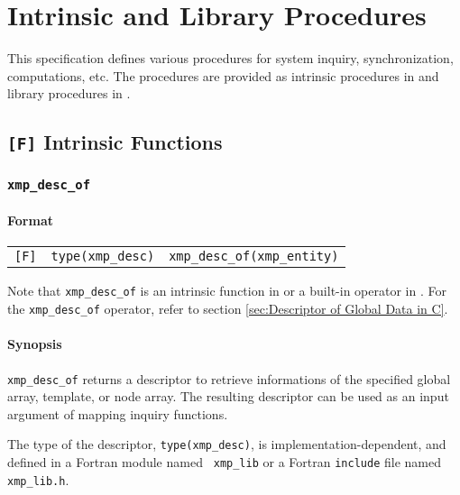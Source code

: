 \chapter{Intrinsic and Library Procedures}
\label{chap:Intrinsic and library procedures}

This specification defines various procedures for system inquiry,
synchronization, computations, etc. The procedures are provided as
intrinsic procedures in {\XMPF} and library procedures in {\XMPC}.

\section{{\tt [F]} Intrinsic Functions}

\subsection{{\tt xmp\_desc\_of}}
\label{subsec: xmp_desc_of}

\subsubsection*{Format}

\begin{tabular}{lll}

\verb![F]!&  {\tt type(xmp\_desc)}& {\tt xmp\_desc\_of(xmp\_entity)}\\

\end{tabular}

\vspace{0.3cm}

Note that {\tt xmp\_desc\_of} is an intrinsic function in {\XMPF} or
a built-in operator in {\XMPC}. For the {\tt xmp\_desc\_of} operator,
refer to section \ref{sec:Descriptor of Global Data in C}.

\subsubsection*{Synopsis}

{\tt xmp\_desc\_of} returns a descriptor to retrieve informations of the
specified global array, template, or node array. The resulting
descriptor can be used as an input argument of mapping inquiry functions.

The type of the descriptor, {\tt type(xmp\_desc)}, is
implementation-dependent, and defined in a Fortran module named {\tt
xmp\_lib} or a Fortran {\tt include} file named {\tt xmp\_lib.h}.

